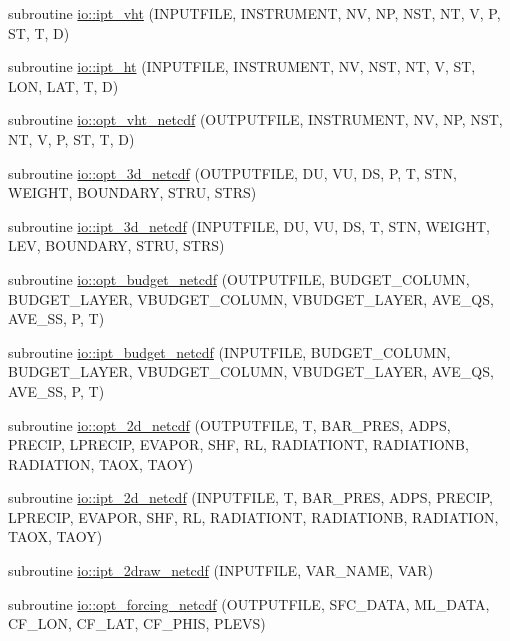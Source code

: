 \begin{DoxyCompactItemize}
\item 
subroutine \hyperlink{namespaceio_abed61f2af0a37265b7a1d15300f61996}{io\+::ipt\+\_\+vht} (I\+N\+P\+U\+T\+F\+I\+LE, I\+N\+S\+T\+R\+U\+M\+E\+NT, NV, NP, N\+ST, NT, V, P, ST, T, D)
\item 
subroutine \hyperlink{namespaceio_ae478b0148dea487c688bfea00e08cade}{io\+::ipt\+\_\+ht} (I\+N\+P\+U\+T\+F\+I\+LE, I\+N\+S\+T\+R\+U\+M\+E\+NT, NV, N\+ST, NT, V, ST, L\+ON, L\+AT, T, D)
\item 
subroutine \hyperlink{namespaceio_a1feb605e982e6696d29a63e635b8d3e1}{io\+::opt\+\_\+vht\+\_\+netcdf} (O\+U\+T\+P\+U\+T\+F\+I\+LE, I\+N\+S\+T\+R\+U\+M\+E\+NT, NV, NP, N\+ST, NT, V, P, ST, T, D)
\item 
subroutine \hyperlink{namespaceio_a63d1618c60598d1e5ac65348efb74bdc}{io\+::opt\+\_\+3d\+\_\+netcdf} (O\+U\+T\+P\+U\+T\+F\+I\+LE, DU, VU, DS, P, T, S\+TN, W\+E\+I\+G\+HT, B\+O\+U\+N\+D\+A\+RY, S\+T\+RU, S\+T\+RS)
\item 
subroutine \hyperlink{namespaceio_a0f9f8edb9a7173638e450ce3c4db7844}{io\+::ipt\+\_\+3d\+\_\+netcdf} (I\+N\+P\+U\+T\+F\+I\+LE, DU, VU, DS, T, S\+TN, W\+E\+I\+G\+HT, L\+EV, B\+O\+U\+N\+D\+A\+RY, S\+T\+RU, S\+T\+RS)
\item 
subroutine \hyperlink{namespaceio_ab1a423779bddf2d4557f39dd81431d93}{io\+::opt\+\_\+budget\+\_\+netcdf} (O\+U\+T\+P\+U\+T\+F\+I\+LE, B\+U\+D\+G\+E\+T\+\_\+\+C\+O\+L\+U\+MN, B\+U\+D\+G\+E\+T\+\_\+\+L\+A\+Y\+ER, V\+B\+U\+D\+G\+E\+T\+\_\+\+C\+O\+L\+U\+MN, V\+B\+U\+D\+G\+E\+T\+\_\+\+L\+A\+Y\+ER, A\+V\+E\+\_\+\+QS, A\+V\+E\+\_\+\+SS, P, T)
\item 
subroutine \hyperlink{namespaceio_aba707a842ac0a3e2e9def20af0b36c32}{io\+::ipt\+\_\+budget\+\_\+netcdf} (I\+N\+P\+U\+T\+F\+I\+LE, B\+U\+D\+G\+E\+T\+\_\+\+C\+O\+L\+U\+MN, B\+U\+D\+G\+E\+T\+\_\+\+L\+A\+Y\+ER, V\+B\+U\+D\+G\+E\+T\+\_\+\+C\+O\+L\+U\+MN, V\+B\+U\+D\+G\+E\+T\+\_\+\+L\+A\+Y\+ER, A\+V\+E\+\_\+\+QS, A\+V\+E\+\_\+\+SS, P, T)
\item 
subroutine \hyperlink{namespaceio_ab6bcb3dc7b4a08b242b7fbd4e11ed319}{io\+::opt\+\_\+2d\+\_\+netcdf} (O\+U\+T\+P\+U\+T\+F\+I\+LE, T, B\+A\+R\+\_\+\+P\+R\+ES, A\+D\+PS, P\+R\+E\+C\+IP, L\+P\+R\+E\+C\+IP, E\+V\+A\+P\+OR, S\+HF, RL, R\+A\+D\+I\+A\+T\+I\+O\+NT, R\+A\+D\+I\+A\+T\+I\+O\+NB, R\+A\+D\+I\+A\+T\+I\+ON, T\+A\+OX, T\+A\+OY)
\item 
subroutine \hyperlink{namespaceio_aff87bbb9c43d6db1fedd086586aab0c6}{io\+::ipt\+\_\+2d\+\_\+netcdf} (I\+N\+P\+U\+T\+F\+I\+LE, T, B\+A\+R\+\_\+\+P\+R\+ES, A\+D\+PS, P\+R\+E\+C\+IP, L\+P\+R\+E\+C\+IP, E\+V\+A\+P\+OR, S\+HF, RL, R\+A\+D\+I\+A\+T\+I\+O\+NT, R\+A\+D\+I\+A\+T\+I\+O\+NB, R\+A\+D\+I\+A\+T\+I\+ON, T\+A\+OX, T\+A\+OY)
\item 
subroutine \hyperlink{namespaceio_ac91ebbbf1426451d33f3e32b08f70aee}{io\+::ipt\+\_\+2draw\+\_\+netcdf} (I\+N\+P\+U\+T\+F\+I\+LE, V\+A\+R\+\_\+\+N\+A\+ME, V\+AR)
\item 
subroutine \hyperlink{namespaceio_a50ab1073758d8d341087a0755354011d}{io\+::opt\+\_\+forcing\+\_\+netcdf} (O\+U\+T\+P\+U\+T\+F\+I\+LE, S\+F\+C\+\_\+\+D\+A\+TA, M\+L\+\_\+\+D\+A\+TA, C\+F\+\_\+\+L\+ON, C\+F\+\_\+\+L\+AT, C\+F\+\_\+\+P\+H\+IS, P\+L\+E\+VS)
\end{DoxyCompactItemize}
